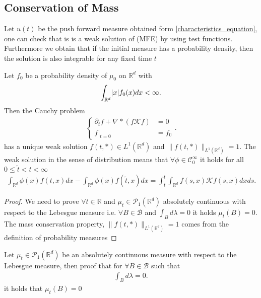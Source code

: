 \subsection{Conservation of Mass}
Let $u(t)$ be the push forward measure obtained form \autoref{characteristics_equation}, one can check that is is a weak solution of (MFE) by using 
test functions. Furthermore we obtain that if the initial measure has a probability density, then the solution is also integrable 
for any fixed time $t$ 
\begin{corollary}
 Let $f_{0}$ be a probability density of $\mu_0$ on $\mathbb{R}^{d}$ with 
 \begin{align*}
   \int_{\mathbb{R}^{d} } \lvert x\rvert f_0(x) dx < \infty
 .\end{align*}
 Then the Cauchy problem 
 \begin{align*}
  \begin{cases}
    \partial_t f + \nabla * (f \mathcal{K} f)  &= 0\\
    f\rvert_{t=0} &= f_{0}
  \end{cases}
 .\end{align*}
 has a unique weak solution $f(t,*) \in  L^{1}(\mathbb{R}^{d} ) $ and $\|f(t,*)\|_{L^{1}(\mathbb{R}^{d} ) } = 1$. The weak solution in 
 the sense of distribution means that $\forall  \phi  \in  \mathcal{C}_0^{\infty} $ it holds for all $0\le \tilde{t}<t<\infty$
 \begin{align*}
   \int_{\mathbb{R}^{d} }\phi(x) f(t,x) dx - \int_{\mathbb{R}^{d} }\phi(x)f(\tilde{t},x )dx = \int_{\tilde{t} }^{t} \int_{\mathbb{R}^{d} }  f(s,x) \mathcal{K}f(s,x) dx ds
 .\end{align*}
\end{corollary}
\begin{proof}
 We need to prove $\forall  t \in  \mathbb{R}$ and $\mu_t \in  \mathcal{P}_1(\mathbb{R}^{d} )$ absolutely continuous with respect to the 
 Lebesgue measure i.e. $\forall  B \in  \mathcal{B}$ and $\int_{B} d\lambda  = 0$ it holds $\mu_t(B) = 0$.
 The mass conservation property, $\|f(t,*)\|_{L^{1}(\mathbb{R}^{d} ) } = 1$  comes from the definition of probability measures
\end{proof}
\begin{exercise}
 Let $\mu_t \in  \mathcal{P}_1(\mathbb{R}^{d} )$  be an absolutely continuous measure with respect to the Lebesgue measure,
 then proof that for $\forall  B \in  \mathcal{B}$ such that 
 \begin{align*}
  \int_B d\lambda  = 0
 .\end{align*}
 it holds that $\mu_t(B) = 0$
\end{exercise}
